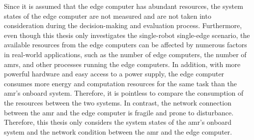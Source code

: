Since it is assumed that the edge computer has abundant resources, the system states of the edge computer are not measured and are not taken into consideration during the decision-making and evaluation process. Furthermore, even though this thesis only investigates the single-robot single-edge scenario, the available resources from the edge computers can be affected by numerous factors in real-world applications, such as the number of edge computers, the number of \glspl{amr}, and other processes running the edge computers. In addition, with more powerful hardware and easy access to a power supply, the edge computer consumes more energy and computation resources for the same task than the \gls{amr}'s onboard system. Therefore, it is pointless to compare the consumption of the resources between the two systems. In contrast, the network connection between the \gls{amr} and the edge computer is fragile and prone to disturbance. Therefore, this thesis only considers the system states of the \gls{amr}'s onboard system and the network condition between the \gls{amr} and the edge computer.


